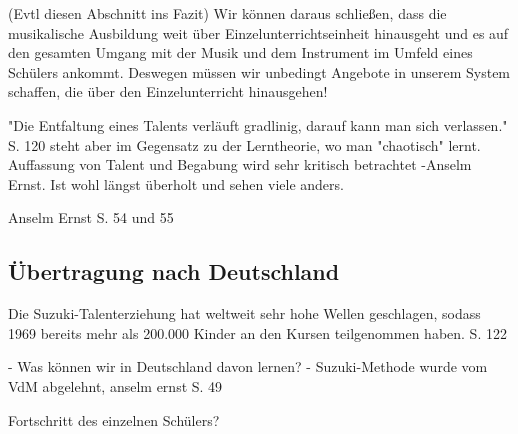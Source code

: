 (Evtl diesen Abschnitt ins Fazit)
Wir können daraus schließen, dass die musikalische Ausbildung weit über
Einzelunterrichtseinheit hinausgeht und es auf den gesamten Umgang mit der Musik
und dem Instrument im Umfeld eines Schülers ankommt. Deswegen müssen wir
unbedingt Angebote in unserem System schaffen, die über den Einzelunterricht
hinausgehen! 



"Die Entfaltung eines Talents verläuft gradlinig, darauf kann man sich
verlassen." S. 120 \autocite[120]{suzuki:erziehung_ist_liebe} steht aber im Gegensatz zu der Lerntheorie, wo man
"chaotisch" lernt.
Auffassung von Talent und Begabung wird sehr kritisch betrachtet -Anselm Ernst. Ist wohl
längst überholt und sehen viele anders.



Anselm Ernst S. 54 und 55


\subsection{Übertragung nach Deutschland}

Die Suzuki-Talenterziehung hat weltweit sehr hohe Wellen geschlagen, sodass 1969
bereits mehr als 200.000 Kinder an den Kursen teilgenommen haben. S. 122

- Was können wir in Deutschland davon lernen? 
- Suzuki-Methode wurde vom VdM abgelehnt, anselm ernst S. 49


Fortschritt des einzelnen Schülers?

